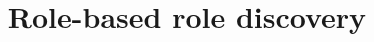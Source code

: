 \documentclass[conference]{IEEEtran}
\begin{document}
\title{Role-based role discovery}
%
%
%
%
%

%
%
%
\end{document}
